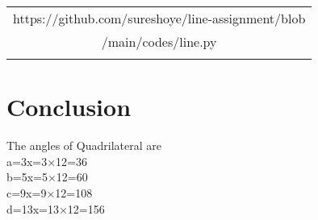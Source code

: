 \documentclass[journal,10pt,twocolumn]{article}
\begin{document}
\begin{table}[H]
\centering
\begin{tabular}{|c|} \hline
\rule{0pt}{10pt} 
https://github.com/sureshoye/line-assignment/blob \\
/main/codes/line.py\\
\\\hline
 \end{tabular}
\end{table}




\section{Conclusion}
\begin{flushleft}
The angles of Quadrilateral are\\
\vspace{0.25cm}
a=3x=3×12=36\textdegree\\
\vspace{0.25cm}
b=5x=5×12=60\textdegree\\
\vspace{0.25cm}
c=9x=9×12=108\textdegree\\
\vspace{0.25cm}
d=13x=13×12=156\textdegree
\end{flushleft}
\endcenter
\end{document}
